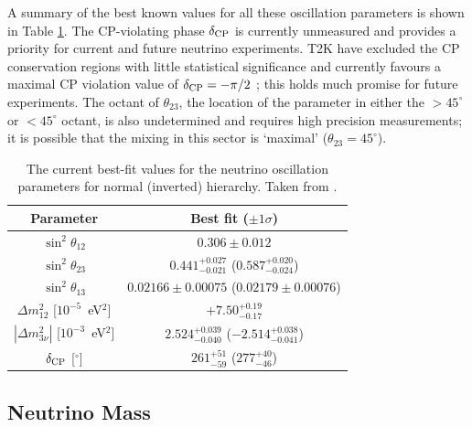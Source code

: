 A summary of the best known values for all these oscillation parameters is shown in Table \ref{tab:OscillationParameters}.  The CP-violating phase $\delta_{\textnormal{CP}}$ is currently unmeasured and provides a priority for current and future neutrino experiments.  T2K have excluded the CP conservation regions with little statistical significance and currently favours a maximal CP violation value of $\delta_{\textnormal{CP}} = -\pi/2$ \cite{T2K2017}; this holds much promise for future experiments.  The octant of $\theta_{23}$, the location of the parameter in either the $> 45^{\circ}$ or $< 45^{\circ}$ octant, is also undetermined and requires high precision measurements; it is possible that the mixing in this sector is `maximal' ($\theta_{23} = 45^{\circ}$).

\begin{table}
  \caption{The current best-fit values for the neutrino oscillation parameters for normal (inverted) hierarchy.  Taken from \cite{NuFit2017}.}
  \label{tab:OscillationParameters}
  \centering
    \begin{tabular}{c c}
      \toprule
      Parameter & Best fit ($\pm 1\sigma$) \\
      \midrule
      $\sin^2{\theta_{12}}$ & $0.306\pm0.012$ \\
      $\sin^2{\theta_{23}}$ & $0.441^{+0.027}_{-0.021}$ ($0.587^{+0.020}_{-0.024}$) \\
      $\sin^2{\theta_{13}}$ & $0.02166\pm0.00075$ ($0.02179\pm0.00076$) \\
      \midrule
      $\Delta m_{12}^2$ [$10^{-5}$~eV$^2$]     & $+7.50^{+0.19}_{-0.17}$ \\
      $|\Delta m_{3\nu}^2|$ [$10^{-3}$~eV$^2$] & $2.524^{+0.039}_{-0.040}$ ($-2.514^{+0.038}_{-0.041}$) \\
      \midrule
      $\delta_{\textnormal{CP}}$ [$^{\circ}$] & $261^{+51}_{-59}$ ($277^{+40}_{-46}$) \\
      \bottomrule
    \end{tabular}
\end{table}

\subsection{Neutrino Mass}\label{sec:NeutrinoMass}


